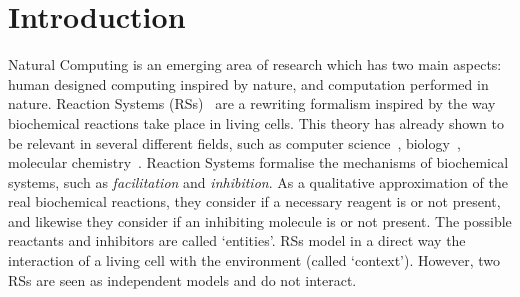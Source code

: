 
\section{Introduction}

Natural Computing is an emerging area of research which has two main 
aspects: human designed computing inspired by nature, and computation 
performed in nature. Reaction Systems (RSs)~\cite{BEMR11} are 
a rewriting formalism
inspired by the way biochemical reactions take place in living 
cells.  
This theory has already shown to be relevant in several different 
fields, such as computer science~\cite{MPR15}, 
biology~\cite{ABP14,CMMBM12,Az17,BarbutiGLM16}, 
molecular chemistry~\cite{OY16}.
Reaction Systems formalise the mechanisms of biochemical systems, 
such as {\em facilitation} and {\em inhibition}. 
As a qualitative approximation of the real biochemical reactions, they
consider if a necessary reagent is or not present, and likewise they
consider if an inhibiting molecule is or not present. 
The  possible reactants and inhibitors are called `entities'.
RSs model in a direct way the interaction of a living cell
with the environment (called `context'). However, two RSs are seen
as independent models and do not interact.


